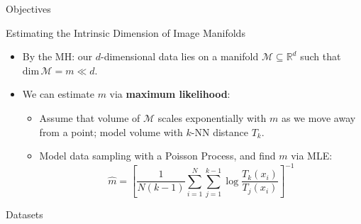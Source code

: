 \documentclass[final,hyperref={pdfpagelabels=false}]{beamer}
\begin{document}
\begin{frame}[t]
\begin{columns}[t]
\begin{column}{.47\textwidth}
\begin{block}{Objectives}
\end{block}

\begin{block}{Estimating the Intrinsic Dimension of Image Manifolds}
\begin{itemize}
    \item By the MH: our $d$-dimensional data lies on a manifold $\mathcal{M}\subseteq \mathbb{R}^d$ such that $\mathrm{dim}\,{\mathcal{M}}=m\ll d$.
\item We can estimate $m$ via \textbf{maximum likelihood}:
    \begin{itemize}
        \item Assume that volume of $\mathcal{M}$ scales exponentially with $m$ as we move away from a point; model volume with $k$-NN distance $T_k$.
        \item Model data sampling with a Poisson Process, and find $m$ via MLE:
        \begin{equation*}
            \label{eq:id_mle}
                \hat{m}=\left[\frac{1}{N(k-1)} \sum_{i=1}^{N} \sum_{j=1}^{k-1} \log \frac{T_{k}\left(x_{i}\right)}{T_{j}\left(x_{i}\right)}\right]^{-1}
        \end{equation*}
    \end{itemize}

\end{itemize}
\end{block}

\begin{block}{Datasets}


\end{block}
\end{column}
\end{columns}
\end{frame}
\end{document}
